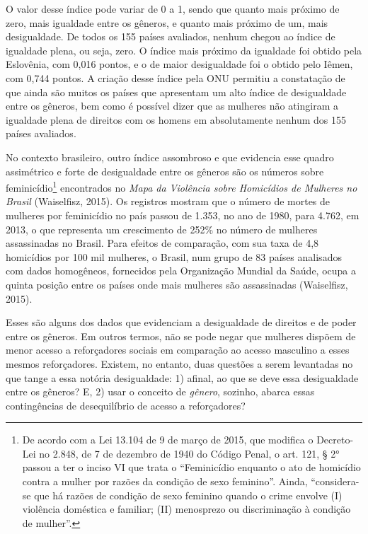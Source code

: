 O valor desse índice pode variar de 0 a 1, sendo que quanto mais próximo de zero, mais igualdade entre os gêneros, e quanto mais próximo de um, mais desigualdade. De todos os 155 países avaliados, nenhum chegou ao índice de igualdade plena, ou seja, zero. O índice mais próximo da igualdade foi obtido pela Eslovênia, com 0,016 pontos, e o de maior desigualdade foi o obtido pelo Iêmen, com 0,744 pontos. A criação desse índice pela ONU permitiu a constatação de que ainda são muitos os países que apresentam um alto índice de desigualdade entre os gêneros, bem como é possível dizer que as mulheres não atingiram a igualdade plena de direitos com os homens em absolutamente nenhum dos 155 países avaliados.

No contexto brasileiro, outro índice assombroso e que evidencia esse quadro assimétrico e forte de desigualdade entre os gêneros são os números sobre feminicídio\footnote{De acordo com a Lei 13.104 de 9 de março de 2015, que modifica o Decreto-Lei no 2.848, de 7 de dezembro de 1940 do Código Penal, o art. 121, § 2° passou a ter o inciso VI que trata o ``Feminicídio enquanto o ato de homicídio contra a mulher por razões da condição de sexo feminino''. Ainda, ``considera-se que há razões de condição de sexo feminino quando o crime envolve (I) violência doméstica e familiar; (II) menosprezo ou discriminação à condição de mulher''.}  encontrados no \textit{Mapa da Violência sobre Homicídios de Mulheres no Brasil} (Waiselfisz, 2015). Os registros mostram que o número de mortes de mulheres por feminicídio no país passou de 1.353, no ano de 1980, para 4.762, em 2013, o que representa um crescimento de 252\% no número de mulheres assassinadas no Brasil. Para efeitos de comparação, com sua taxa de 4,8 homicídios por 100 mil mulheres, o Brasil, num grupo de 83 países analisados com dados homogêneos, fornecidos pela Organização Mundial da Saúde, ocupa a quinta posição entre os países onde mais mulheres são assassinadas (Waiselfisz, 2015).

Esses são alguns dos dados que evidenciam a desigualdade de direitos e de poder entre os gêneros. Em outros termos, não se pode negar que mulheres dispõem de menor acesso a reforçadores sociais em comparação ao acesso masculino a esses mesmos reforçadores. Existem, no entanto, duas questões a serem levantadas no que tange a essa notória desigualdade: 1) afinal, ao que se deve essa desigualdade entre os gêneros? E, 2) usar o conceito de \textit{gênero}, sozinho, abarca essas contingências de desequilíbrio de acesso a reforçadores?

